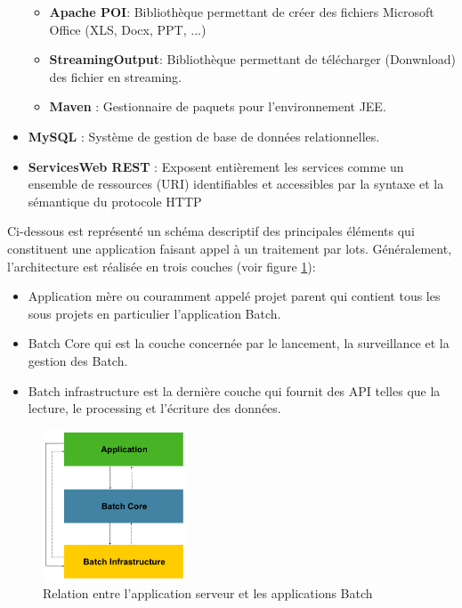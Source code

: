 \begin{itemize}
\begin{itemize}
		\item \textbf{Apache POI}: Bibliothèque permettant de créer des fichiers Microsoft Office (XLS, Docx, PPT, ...)
		\item \textbf{StreamingOutput}: Bibliothèque permettant de télécharger (Donwnload) des fichier en streaming.  
		\item \textbf{Maven} : Gestionnaire de paquets pour l'environnement JEE.
	\end{itemize}  
	\item \textbf{MySQL} : Système de gestion de base de données relationnelles.
	\item \textbf{ServicesWeb REST} : Exposent entièrement les services comme un ensemble de ressources (URI) identifiables et accessibles par la syntaxe et la sémantique du protocole	HTTP
\end{itemize}

Ci-dessous est représenté un schéma descriptif des principales éléments qui constituent une application faisant appel à un traitement par lots. Généralement, l'architecture est réalisée en trois couches (voir figure \ref{fig4.2}):
\begin{itemize}
	\item Application mère ou couramment appelé projet parent qui contient tous les sous projets en particulier l'application Batch.
	\item Batch Core qui est la couche concernée par le lancement, la surveillance et la gestion des Batch.
	\item Batch infrastructure est la dernière couche qui fournit des API telles que la lecture, le processing et l'écriture des données.  
\end{itemize}
\begin{figure}[!h]
	\begin{center}
		\includegraphics[height=4.5cm]{figures/batch_app}
	\end{center}
	\caption{Relation entre l'application serveur et les applications Batch}
	\label{fig4.2}
\end{figure}


